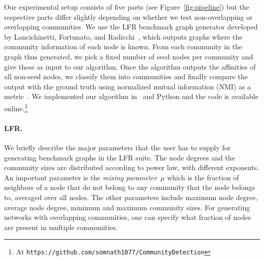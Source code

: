 Our experimental setup consists of five parts (see Figure~\ref{fig:pipeline}) but the 
respective parts differ slightly depending on whether we test non-overlapping or overlapping 
communities. We use the LFR benchmark graph generator developed by Lancichinetti, 
Fortunato, and Radicchi~\cite{LFR08,LF09}, which outputs graphs where the community 
information of each node is known. From each community in the graph thus generated, 
we pick a fixed number of seed nodes per community and give these as input to our algorithm. 
Once the algorithm outputs the affinities of all non-seed nodes, we classify them into 
communities and finally compare the output with the ground truth using 
normalized mutual information (NMI) as a metric~\cite{DDDA05}. We implemented 
our algorithm in \CPP\ and Python and the code is available online.\footnote{At 
\texttt{https://github.com/somnath1077/CommunityDetection}}


\paragraph{LFR.}
%
We briefly describe the major parameters that the user has to supply 
for generating benchmark graphs in the LFR suite. The node degrees and the 
community sizes are distributed according to power law, with different exponents. 
An important parameter is the \emph{mixing parameter~$\mu$} which is the fraction of neighbors 
of a node that do not belong to any community that the node belongs to, averaged over all nodes.
The other parameters include maximum node degree, average node degree, 
minimum and maximum community sizes. For generating networks with overlapping communities, 
one can specify what fraction of nodes are present in multiple communities.


